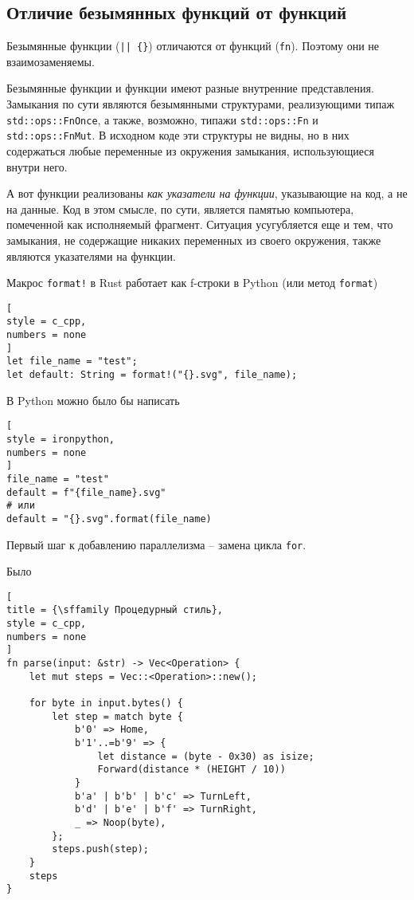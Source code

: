 \documentclass[%
	11pt,
	a4paper,
	utf8,
		]{article}
\begin{document}
\subsection{Отличие безымянных функций от функций}

Безымянные функции (\texttt{|| \{\}}) отличаются от функций (\verb|fn|). Поэтому они не взаимозаменяемы. 

Безымянные функции и функции имеют разные внутренние представления. Замыкания по сути являются безымянными структурами, реализующими типаж \verb|std::ops::FnOnce|, а также, возможно, типажи \verb|std::ops::Fn| и \verb|std::ops::FnMut|. В исходном коде эти структуры не видны, но в них содержаться любые переменные из окружения замыкания, использующиеся внутри него.

А вот функции реализованы \emph{как указатели на функции}, указывающие на код, а не на данные. Код в этом смысле, по сути, является памятью компьютера, помеченной как исполняемый фрагмент. Ситуация усугубляется еще и тем, что замыкания, не содержащие никаких переменных из своего окружения, также являются указателями на функции.

Макрос \verb|format!| в Rust работает как f-строки в Python (или метод \verb|format|)
\begin{lstlisting}[
style = c_cpp,
numbers = none
]
let file_name = "test";
let default: String = format!("{}.svg", file_name);
\end{lstlisting}

В Python можно было бы написать
\begin{lstlisting}[
style = ironpython,
numbers = none
]
file_name = "test"
default = f"{file_name}.svg"
# или
default = "{}.svg".format(file_name)
\end{lstlisting}

Первый шаг к добавлению параллелизма -- замена цикла \verb|for|.

Было
\begin{lstlisting}[
title = {\sffamily Процедурный стиль},
style = c_cpp,
numbers = none
]
fn parse(input: &str) -> Vec<Operation> {
    let mut steps = Vec::<Operation>::new();
    
    for byte in input.bytes() {
        let step = match byte {
            b'0' => Home,
            b'1'..=b'9' => {
                let distance = (byte - 0x30) as isize;
                Forward(distance * (HEIGHT / 10))
            }
            b'a' | b'b' | b'c' => TurnLeft,
            b'd' | b'e' | b'f' => TurnRight,
            _ => Noop(byte),
        };
        steps.push(step);
    }
    steps
}
\end{lstlisting}
\end{document}
